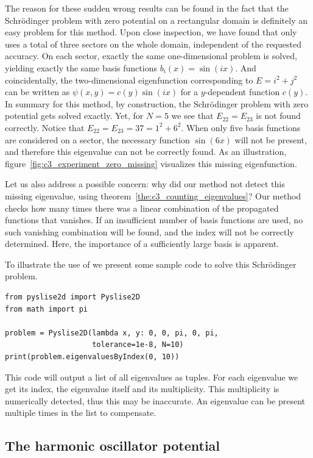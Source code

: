 The reason for these sudden wrong results can be found in the fact that the Schrödinger problem with zero potential on a rectangular domain is definitely an easy problem for this method. Upon close inspection, we have found that \pyslisetd{} only uses a total of three sectors on the whole domain, independent of the requested accuracy. On each sector, exactly the same one-dimensional problem is solved, yielding exactly the same basis functions $b_i(x) = \sin(i x)$. And coincidentally, the two-dimensional eigenfunction corresponding to $E = i^2 + j^2$ can be written as $\psi(x, y) = c(y) \sin(i x)$ for a $y$-dependent function $c(y)$. In summary for this method, by construction, the Schrödinger problem with zero potential gets solved exactly. Yet, for $N=5$ we see that $E_{22} = E_{23}$ is not found correctly. Notice that $E_{22} = E_{23} = 37 = 1^2 + 6^2$. When only five basis functions are considered on a sector, the necessary function $\sin(6 x)$ will not be present, and therefore this eigenvalue can not be correctly found. As an illustration, figure~\ref{fig:c3_experiment_zero_missing} visualizes this missing eigenfunction.

Let us also address a possible concern: why did our method not detect this missing eigenvalue, using theorem~\ref{the:c3_counting_eigenvalues}? Our method checks how many times there was a linear combination of the propagated functions that vanishes. If an insufficient number of basis functions are used, no such vanishing combination will be found, and the index will not be correctly determined. Here, the importance of a sufficiently large basis is apparent.

To illustrate the use of \pyslisetd{} we present some sample code to solve this Schrödinger problem.
\begin{verbatim}
from pyslise2d import Pyslise2D
from math import pi

problem = Pyslise2D(lambda x, y: 0, 0, pi, 0, pi,
                    tolerance=1e-8, N=10)
print(problem.eigenvaluesByIndex(0, 10))
\end{verbatim}
This code will output a list of all eigenvalues as tuples. For each eigenvalue we get its index, the eigenvalue itself and its multiplicity. This multiplicity is numerically detected, thus this may be inaccurate. An eigenvalue can be present multiple times in the list to compensate.


\subsection{The harmonic oscillator potential}\label{sec:c3_experiment_harmonic}

